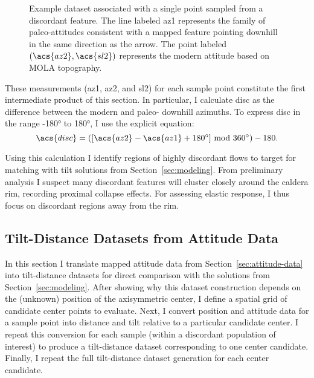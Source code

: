 \begin{figure}
    {\caption[Sample point attitude dataset]{
        Example dataset associated with a single point sampled from a discordant feature. The line labeled \acs{az1} represents the family of paleo-attitudes consistent with a mapped feature pointing downhill in the same direction as the arrow. The point labeled $(\acs{az2},\acs{sl2})$ represents the modern attitude based on \ac{MOLA} topography.
    }\label{fig:attitude-data}}
    {}
\end{figure}

These measurements (\acf{az1}, \acf{az2}, and \acf{sl2}) for each sample point constitute the first intermediate product of this section. In particular, I calculate \acl{disc} as the difference between the modern and paleo- downhill azimuths. To express \ac{disc} in the range \ang{-180} to \ang{180}, I use the explicit equation:
\begin{equation}
    \acs{disc} = ([\acs{az2} - \acs{az1} + \ang{180}] \text{ mod } \ang{360}) - 180.
\end{equation}

Using this calculation I identify regions of highly discordant flows to target for matching with tilt solutions from Section~\ref{sec:modeling}. From preliminary analysis I suspect many discordant features will cluster closely around the caldera rim, recording proximal collapse effects. %
For assessing elastic response, I thus focus on discordant regions away from the rim.

\subsection{Tilt-Distance Datasets from Attitude Data}\label{sec:tilt-from-map}

In this section I translate mapped attitude data from Section~\ref{sec:attitude-data} into tilt-distance datasets for direct comparison with the solutions from Section~\ref{sec:modeling}. After showing why this dataset construction depends on the (unknown) position of the axisymmetric center, I define a spatial grid of candidate center points to evaluate. Next, I convert position and attitude data for a sample point into distance and tilt relative to a particular candidate center. I repeat this conversion for each sample (within a discordant population of interest) to produce a tilt-distance dataset corresponding to one center candidate. Finally, I repeat the full tilt-distance dataset generation for each center candidate.

